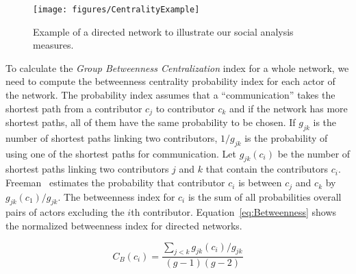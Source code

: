 \begin{figure}[t]
\begin{center}
\texttt{[image: figures/CentralityExample]}
\caption{Example of a directed network to illustrate our social
analysis measures.}
\label{fig:CentralityExample}
\end{center}
\end{figure}

To calculate the \emph{Group Betweenness Centralization} index for a whole
network, we need to compute the betweenness centrality probability index for each
actor of the network. The probability index assumes that a ``communication''
takes the shortest path from a contributor $c_j$ to contributor $c_k$ and if the
network has more shortest paths, all of them have the same probability to be
chosen. If $g_{jk}$ is the number of shortest paths linking two contributors,
$1/g_{jk}$ is the probability of using one of the shortest paths for
communication. Let $g_{jk}(c_i)$ be the number of shortest paths linking two
contributors $j$ and $k$ that contain the contributors $c_i$. Freeman~\cite{Freeman:1979rl}
estimates the probability that contributor $c_i$ is between $c_j$ and $c_k$ by
$g_{jk}(c_1)/g_{jk}$. The betweenness index for $c_i$ is the sum of all
probabilities overall pairs of actors excluding the $i$th contributor.
Equation~\ref{eq:Betweenness} shows the normalized betweenness index for
directed networks.

\begin{equation}
\displaystyle C_B(c_i) =  \frac{\sum_{j<k} g_{jk}(c_i)/g_{jk}}{(g-1)(g-2)}
\label{eq:Betweenness}
\end{equation}

